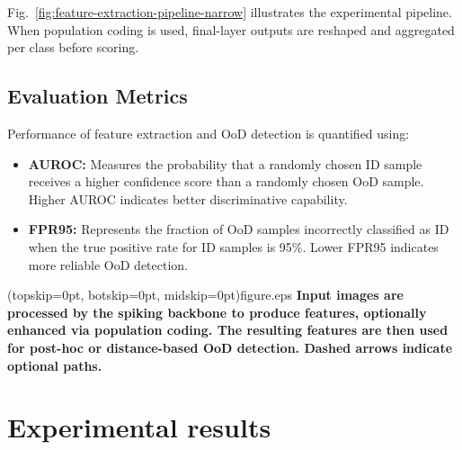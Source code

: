\documentclass{ieeeaccess}
\begin{document}
Fig.~\ref{fig:feature-extraction-pipeline-narrow} illustrates the experimental pipeline. When population coding is used, final-layer outputs are reshaped and aggregated per class before scoring.

\subsection{Evaluation Metrics}
Performance of feature extraction and OoD detection is quantified using:
\begin{itemize}
    \item \textbf{AUROC:} Measures the probability that a randomly chosen ID sample receives a higher confidence score than a randomly chosen OoD sample. Higher AUROC indicates better discriminative capability.
    \item \textbf{FPR95:} Represents the fraction of OoD samples incorrectly classified as ID when the true positive rate for ID samples is 95\%. Lower FPR95 indicates more reliable OoD detection.
\end{itemize}

\Figure[t!](topskip=0pt, botskip=0pt, midskip=0pt){figure.eps}
{ \textbf{Input images are processed by the spiking backbone to produce features, optionally enhanced via population coding. The resulting features are then used for post-hoc or distance-based OoD detection. Dashed arrows indicate optional paths.}\label{fig:feature-extraction-pipeline-narrow}}


\section{Experimental results}
\label{sec:results}
\end{document}
